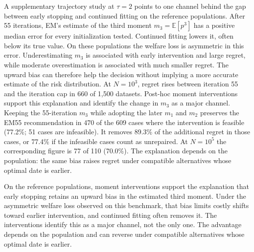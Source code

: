 A supplementary trajectory study at $\tau=2$ points to one channel behind the
gap between early stopping and continued fitting on the reference
populations.  After 55 iterations, EM's estimate of the third moment
$m_3=\mathbb{E}[p^3]$ has a positive median error for every initialization
tested.  Continued fitting lowers it, often below its true value.  On these
populations the welfare loss is asymmetric in this error.  Underestimating
$m_3$ is associated with early intervention and large regret, while moderate
overestimation is associated with much smaller regret.  The upward bias can
therefore help the decision without implying a more accurate estimate of the
risk distribution.  At $N=10^3$, regret rises between iteration 55 and the
iteration cap in 660 of 1{,}500 datasets.  Post-hoc moment interventions
support this explanation and identify the change in $m_3$ as a major
channel.  Keeping the 55-iteration $m_3$ while adopting the later $m_1$ and
$m_2$ preserves the EM55 recommendation in 470 of the 609 cases where the
intervention is feasible (77.2\%; 51 cases are infeasible).  It removes
89.3\% of the additional regret in those cases, or 77.4\% if the infeasible
cases count as unrepaired.  At $N=10^5$ the corresponding figure is 77 of 110
(70.0\%).  The explanation depends on the population: the same bias raises
regret under compatible alternatives whose optimal date is earlier.


On the reference populations, moment interventions support the explanation
that early stopping retains an upward bias in the estimated third moment.
Under the asymmetric welfare loss observed on this benchmark, that bias
limits costly shifts toward earlier intervention, and continued fitting often
removes it.  The interventions identify this as a major channel, not the only
one.  The advantage depends on the population and can reverse under
compatible alternatives whose optimal date is earlier.


